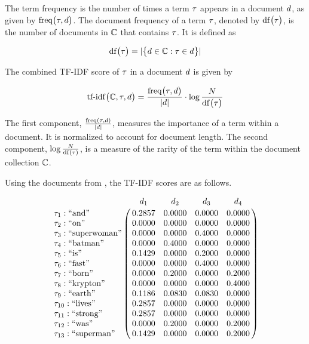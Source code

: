 		\begin{defn}
			The term frequency is the number of times a term $\tau$ appears in a document $d$, as given by $\operatorname{freq}\bigl(\tau, d\bigr)$.  The document frequency of a term $\tau$, denoted by $\operatorname{df}\bigl(\tau\bigr)$, is the number of documents in $\mathbb{C}$ that contains $\tau$.  It is defined as
			
			\[
			    \operatorname{df}\bigl(\tau\bigr) = \lvert\bigl\{d \in \mathbb{C}: \tau \in d\bigr\}\rvert
			\]
			
			The combined TF-IDF score of $\tau$ in a document $d$ is given by
			
			\[
			    \operatorname{tf-idf}\bigl(\mathbb{C}, \tau, d\bigr) = \frac{\operatorname{freq}\bigl(\tau, d\bigr)}{\lvert d\rvert} \cdot \log{\frac{N}{\operatorname{df}\bigl(\ensuremath \tau\bigr)}}
			\]
		\end{defn}
		
		\begin{remark}
			The first component, $\frac{\operatorname{freq}\left(\tau, d\right)}{\lvert d\rvert}$, measures the importance of a term within a document.  It is normalized to account for document length.  The second component, $\log{\frac{N}{\operatorname{df}\left(\ensuremath \tau\right)}}$, is a measure of the rarity of the term within the document collection $\mathbb{C}$.
		\end{remark}
		
		\begin{ex}
			Using the documents from , the TF-IDF scores are as follows.
			
			\[
    			\bordermatrix{
    				~ & \doc_1 & \doc_2 & \doc_3 & \doc_4 \cr
    				\term_1 : \textrm{``and''} & 0.2857 & 0.0000 & 0.0000 & 0.0000 \cr
    				\term_2 : \textrm{``on''} & 0.0000 & 0.0000 & 0.0000 & 0.0000 \cr
    				\term_3 : \textrm{``superwoman''} & 0.0000 & 0.0000 & 0.4000 & 0.0000 \cr
    				\term_4 : \textrm{``batman''} & 0.0000 & 0.4000 & 0.0000 & 0.0000 \cr
    				\term_5 : \textrm{``is''} & 0.1429 & 0.0000 & 0.2000 & 0.0000 \cr
    				\term_6 : \textrm{``fast''} & 0.0000 & 0.0000 & 0.4000 & 0.0000 \cr
    				\term_7 : \textrm{``born''} & 0.0000 & 0.2000 & 0.0000 & 0.2000 \cr
    				\term_8 : \textrm{``krypton''} & 0.0000 & 0.0000 & 0.0000 & 0.4000 \cr
    				\term_9 : \textrm{``earth''} & 0.1186 & 0.0830 & 0.0830 & 0.0000 \cr
    				\term_{10} : \textrm{``lives''} & 0.2857 & 0.0000 & 0.0000 & 0.0000 \cr
    				\term_{11} : \textrm{``strong''} & 0.2857 & 0.0000 & 0.0000 & 0.0000 \cr
    				\term_{12} : \textrm{``was''} & 0.0000 & 0.2000 & 0.0000 & 0.2000 \cr
    				\term_{13} : \textrm{``superman''} & 0.1429 & 0.0000 & 0.0000 & 0.2000 \cr
    			}
			\]
		\end{ex}

